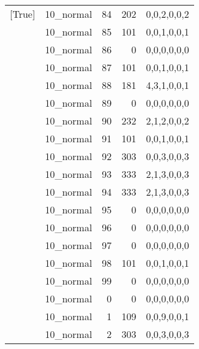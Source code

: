 \begin{tabular}{llrrl}
 [True]          & 10\_normal           &            84 &                   202 & 0,0,2,0,0,2   \\
 [True]          & 10\_normal           &            85 &                   101 & 0,0,1,0,0,1   \\
 [True]          & 10\_normal           &            86 &                     0 & 0,0,0,0,0,0   \\
 [True]          & 10\_normal           &            87 &                   101 & 0,0,1,0,0,1   \\
 [True]          & 10\_normal           &            88 &                   181 & 4,3,1,0,0,1   \\
 [True]          & 10\_normal           &            89 &                     0 & 0,0,0,0,0,0   \\
 [True]          & 10\_normal           &            90 &                   232 & 2,1,2,0,0,2   \\
 [True]          & 10\_normal           &            91 &                   101 & 0,0,1,0,0,1   \\
 [True]          & 10\_normal           &            92 &                   303 & 0,0,3,0,0,3   \\
 [True]          & 10\_normal           &            93 &                   333 & 2,1,3,0,0,3   \\
 [True]          & 10\_normal           &            94 &                   333 & 2,1,3,0,0,3   \\
 [True]          & 10\_normal           &            95 &                     0 & 0,0,0,0,0,0   \\
 [True]          & 10\_normal           &            96 &                     0 & 0,0,0,0,0,0   \\
 [True]          & 10\_normal           &            97 &                     0 & 0,0,0,0,0,0   \\
 [True]          & 10\_normal           &            98 &                   101 & 0,0,1,0,0,1   \\
 [True]          & 10\_normal           &            99 &                     0 & 0,0,0,0,0,0   \\
 [True]          & 10\_normal           &             0 &                     0 & 0,0,0,0,0,0   \\
 [True]          & 10\_normal           &             1 &                   109 & 0,0,9,0,0,1   \\
 [True]          & 10\_normal           &             2 &                   303 & 0,0,3,0,0,3   \\

\end{tabular}
